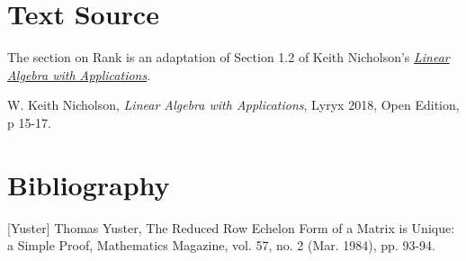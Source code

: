 \documentclass{ximera}
\begin{document}
 
\section*{Text Source}
The section on Rank is an adaptation of Section 1.2 of Keith Nicholson's \href{https://open.umn.edu/opentextbooks/textbooks/linear-algebra-with-applications}{\it Linear Algebra with Applications}.
 
W. Keith Nicholson, {\it Linear Algebra with Applications}, Lyryx 2018, Open Edition, p 15-17.
 
\section*{Bibliography}
 
[Yuster] Thomas Yuster, The Reduced Row Echelon Form of a Matrix is Unique: a
Simple Proof, Mathematics Magazine, vol. 57, no. 2 (Mar. 1984), pp. 93-94.
 
\end{document}
